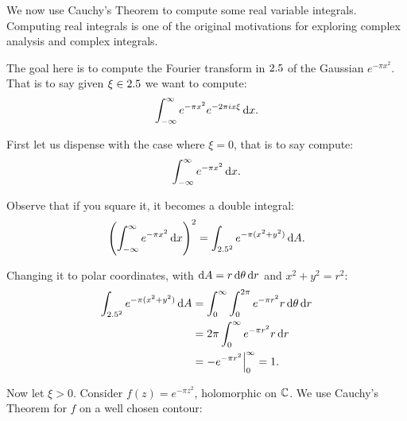We now use Cauchy's Theorem to compute some real variable integrals. Computing real integrals is one of the original motivations for exploring complex analysis and complex integrals.

\begin{example}\label{ex:fourier-trans-gaussian}

The goal here is to compute the Fourier transform in $2.5$ of the Gaussian $e^{- \pi x^2}$.  That is to say given $\xi \in 2.5$ we want to compute:
\begin{align*}
    \int_{-\infty}^{\infty} e^{- \pi x^2} e^{- 2 \pi i x \xi} \dif x.
\end{align*}

First let us dispense with the case where $\xi = 0$, that is to say compute:
\begin{align*}
    \int_{-\infty}^{\infty} e^{- \pi x^2} \dif x.
\end{align*}

Observe that if you square it, it becomes a double integral:
\begin{align*}
    \left(  \int_{-\infty}^{\infty} e^{- \pi x^2}  \dif x \right)^2 = \int_{\R ^2}  e^{- \pi( x^2+y^2)}  \dif A.
\end{align*}

Changing it to polar coordinates, with $\dif A = r \dif \theta \dif r $ and $x^2+y^2 = r^2$:
\begin{align*}
    \int_{\R ^2}  e^{- \pi( x^2+y^2)}  \dif A &= \int_{0}^{\infty} \int_{0}^{2 \pi} e^{- \pi r^2}  r \dif \theta \dif r \\
    &= 2 \pi \int_{0}^{\infty}  e^{- \pi r^2}  r \dif r \\
    &= -e^{-\pi r^2} \Bigr|_0^\infty = 1.
\end{align*}

Now let $\xi > 0$. Consider $f(z) =  e^{- \pi z^2}$, holomorphic on $\mathbb{C}$. We use Cauchy's Theorem for $f$ on a well chosen contour:

\begin{center}
\end{center}
\end{example}
